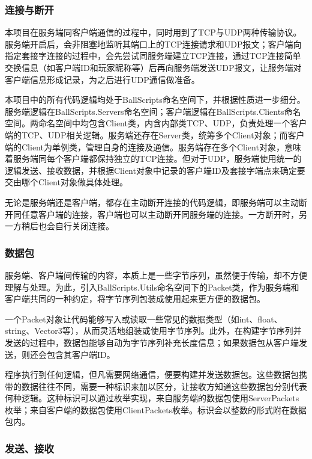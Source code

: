 \documentclass[conference]{IEEEtran}
\begin{document}
\subsubsection{连接与断开}
\quad 

本项目在服务端同客户端通信的过程中，同时用到了TCP与UDP两种传输协议。服务端开启后，会非阻塞地监听其端口上的TCP连接请求和UDP报文；客户端向指定套接字连接的过程中，会先尝试同服务端建立TCP连接，通过TCP连接简单交换信息（如客户端ID和玩家昵称等）后再向服务端发送UDP报文，让服务端对客户端信息形成记录，为之后进行UDP通信做准备。

本项目中的所有代码逻辑均处于BallScripts命名空间下，并根据性质进一步细分。服务端逻辑在BallScripts.Servers命名空间；客户端逻辑在BallScripts.Clients命名空间。两命名空间中均包含Client类，内含内部类TCP、UDP，负责处理一个客户端的TCP、UDP相关逻辑。服务端还存在Server类，统筹多个Client对象；而客户端的Client为单例类，管理自身的连接及通信。服务端存在多个Client对象，意味着服务端同每个客户端都保持独立的TCP连接。但对于UDP，服务端使用统一的逻辑发送、接收数据，并根据Client对象中记录的客户端ID及套接字端点来确定要交由哪个Client对象做具体处理。

无论是服务端还是客户端，都存在主动断开连接的代码逻辑，即服务端可以主动断开同任意客户端的连接，客户端也可以主动断开同服务端的连接。一方断开时，另一方稍后也会自行关闭连接。

\subsubsection{数据包}
\quad

服务端、客户端间传输的内容，本质上是一些字节序列，虽然便于传输，却不方便理解与处理。为此，引入BallScripts.Utils命名空间下的Packet类，作为服务端和客户端共同的一种约定，将字节序列包装成使用起来更方便的数据包。

一个Packet对象让代码能够写入或读取一些常见的数据类型（如int、float、string、Vector3等），从而灵活地组装或使用字节序列。此外，在构建字节序列并发送的过程中，数据包能够自动为字节序列补充长度信息；如果数据包从客户端发送，则还会包含其客户端ID。

程序执行到任何逻辑，但凡需要网络通信，便要构建并发送数据包。这些数据包携带的数据往往不同，需要一种标识来加以区分，让接收方知道这些数据包分别代表何种逻辑。这种标识可以通过枚举实现，来自服务端的数据包使用ServerPackets枚举；来自客户端的数据包使用ClientPackets枚举。标识会以整数的形式附在数据包内。

\subsubsection{发送、接收}
\quad
\end{document}

